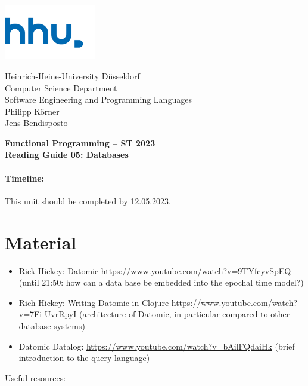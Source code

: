 \documentclass[11pt,a4paper]{article}
\begin{document}
\begin{minipage}[b]{\textwidth}
	\parbox[t]{5cm}{%
		\includegraphics[width=4cm]{unilogo}
		\hfill
	}
	\parbox[b]{11cm}{%
		Heinrich-Heine-University D\"usseldorf\\
		Computer Science Department\\
		Software Engineering and Programming Languages\\
		Philipp K\"orner \\
        Jens Bendisposto
	}
\end{minipage}
\begin{center}
	\bf
	Functional Programming -- ST 2023\\
    Reading Guide 05: Databases
\end{center}

\pagestyle{empty}

\paragraph{Timeline:} This unit should be completed by 12.05.2023.

\section{Material} 

\renewcommand{\labelenumi}{\Alph{enumi}}
\begin{itemize}    
	
	\item Rick Hickey: Datomic \url{https://www.youtube.com/watch?v=9TYfcyvSpEQ}
    (until 21:50: how can a data base be embedded into the epochal time model?)
	
	\item Rich Hickey: Writing Datomic in Clojure \url{https://www.youtube.com/watch?v=7Fi-UvrRpyI}
    (architecture of Datomic, in particular compared to other database systems)
	
    \item Datomic Datalog: \url{https://www.youtube.com/watch?v=bAilFQdaiHk}
    (brief introduction to the query language)
\end{itemize} 

Useful resources:
\end{document}
